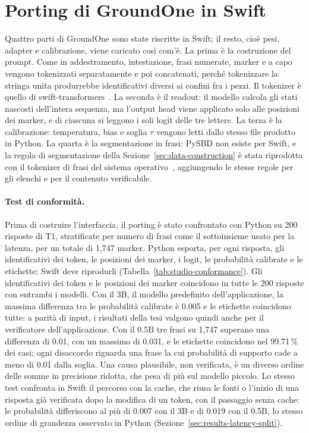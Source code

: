 \section{Porting di GroundOne in Swift}
\label{sec:studio-port}

Quattro parti di GroundOne sono state riscritte in Swift; il resto, cioè pesi, adapter e calibrazione, viene caricato
così com'è. La prima è la costruzione del prompt. Come in addestramento, intestazione, frasi numerate, marker e a capo
vengono tokenizzati separatamente e poi concatenati, perché tokenizzare la stringa unita produrrebbe identificativi
diversi ai confini fra i pezzi. Il tokenizer è quello di swift-transformers~\cite{hf2026swifttransformers}. La seconda è il
readout: il modello calcola gli stati nascosti dell'intera sequenza, ma l'output head viene applicato solo alle posizioni
dei marker, e di ciascuna si leggono i soli logit delle tre lettere. La terza è la calibrazione: temperatura, bias e soglia
$\tau$ vengono letti dallo stesso file prodotto in Python. La quarta è la segmentazione in frasi: PySBD non esiste per
Swift, e la regola di segmentazione della Sezione~\ref{sec:data-construction} è stata riprodotta con il tokenizer di frasi
del sistema operativo~\cite{apple2026nltokenizer}, aggiungendo le stesse regole per gli elenchi e per il contenuto
verificabile.

\paragraph{Test di conformità.} Prima di costruire l'interfaccia, il porting è stato confrontato con Python su 200 risposte
di T1, stratificate per numero di frasi come il sottoinsieme usato per la latenza, per un totale di 1{,}747 marker. Python
esporta, per ogni risposta, gli identificativi dei token, le posizioni dei marker, i logit, le probabilità calibrate e le
etichette; Swift deve riprodurli (Tabella~\ref{tab:studio-conformance}). Gli identificativi dei token e le posizioni dei
marker coincidono in tutte le 200 risposte con entrambi i modelli. Con il 3B, il modello predefinito dell'applicazione, la
massima differenza tra le probabilità calibrate è 0.005 e le etichette coincidono tutte: a parità di input, i risultati
della tesi valgono quindi anche per il verificatore dell'applicazione. Con il 0.5B tre frasi su 1{,}747 superano una
differenza di 0.01, con un massimo di 0.031, e le etichette coincidono nel 99.71\,\% dei casi; ogni disaccordo riguarda
una frase la cui probabilità di supporto cade a meno di 0.01 dalla soglia. Una causa plausibile, non verificata, è un
diverso ordine delle somme in precisione ridotta, che pesa di più sul modello piccolo. Lo stesso test confronta in Swift il percorso con la cache, che riusa le fonti o l'inizio di una risposta già verificata dopo la modifica di un token, con il passaggio senza cache: le probabilità differiscono al più di 0.007 con il 3B e di 0.019 con il 0.5B, lo stesso ordine di grandezza osservato in Python (Sezione~\ref{sec:results-latency-split}).

